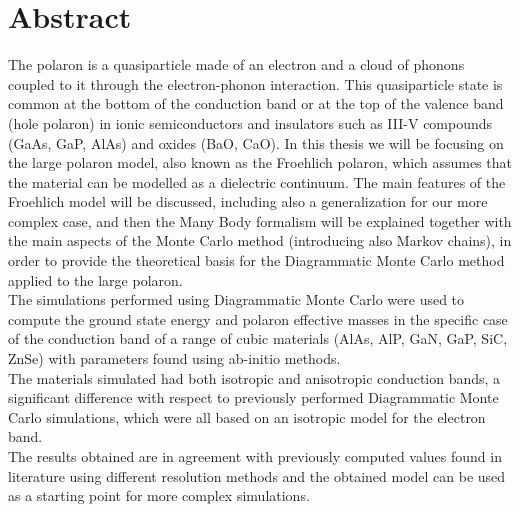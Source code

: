 \pagebreak
    \hspace{0pt}
    \vfill
    \section*{Abstract}
    
    The polaron is a quasiparticle made of an electron and a cloud of phonons coupled to it through the electron-phonon interaction. This quasiparticle state 
    is common at the bottom of the conduction band or at the top of the valence band (hole polaron) in ionic semiconductors and insulators such as III-V compounds (GaAs, GaP, AlAs) and 
    oxides (BaO, CaO). In this thesis we will be focusing on the large polaron model, also known as the Froehlich polaron, which assumes that the material can be modelled as 
    a dielectric continuum. The main features of the Froehlich model will be discussed, including also a generalization for our more complex case, and then the Many Body formalism will be 
    explained together with the main aspects of the Monte Carlo method (introducing also Markov chains), in order to provide the theoretical basis for the Diagrammatic Monte Carlo method applied to the large polaron.\\
    The simulations performed using Diagrammatic Monte Carlo were used to compute the ground state energy and polaron effective masses in the specific case of 
    the conduction band of a range of cubic materials (AlAs, AlP, GaN, GaP, SiC, ZnSe) with parameters found using ab-initio methods.\\ 
    The materials simulated had both isotropic and anisotropic conduction bands, a significant difference with respect to previously performed Diagrammatic Monte Carlo simulations, which were all 
    based on an isotropic model for the electron band.\\
    The results obtained are in agreement with previously computed values found in literature using different resolution methods and the obtained model 
    can be used as a starting point for more complex simulations.

    
    \vfill
    \hspace{0pt}
\pagebreak